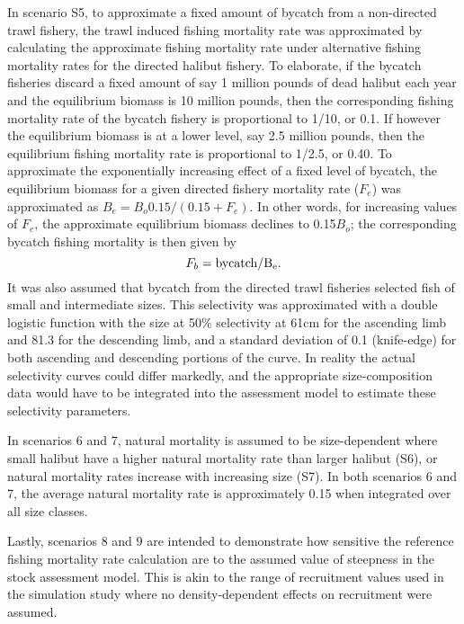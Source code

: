 In scenario S5, to approximate a fixed amount of bycatch from a non-directed trawl fishery, the trawl induced fishing mortality rate was approximated by calculating the approximate fishing mortality rate under alternative  fishing mortality rates for the directed halibut fishery.  To elaborate, if the bycatch fisheries discard a fixed amount of say 1 million pounds of dead halibut each year and the equilibrium biomass is 10 million pounds, then the corresponding fishing mortality rate of the bycatch fishery is proportional to 1/10, or 0.1.  If however the equilibrium biomass is at a lower level, say 2.5 million pounds, then the equilibrium fishing mortality rate is proportional to 1/2.5, or 0.40.  To approximate the exponentially increasing effect of a fixed level of bycatch, the equilibrium biomass for a given directed fishery mortality rate ($F_e$) was approximated as $B_e = B_o 0.15/(0.15+F_e)$.  In other words, for increasing values of $F_e$, the approximate equilibrium biomass declines to 0.15$B_o$; the corresponding bycatch fishing mortality is then given by \[F_b = \rm{bycatch}/B_e.\]  It was also assumed that bycatch from the directed trawl fisheries selected fish of small and intermediate sizes.  This selectivity was approximated with a double logistic function with the size at 50\% selectivity at 61cm for the ascending limb and 81.3 for the descending limb, and a standard deviation of 0.1 (knife-edge) for both ascending and descending portions of the curve.  In reality the actual selectivity curves could differ markedly, and the appropriate size-composition data would have to be integrated into the assessment model to estimate these selectivity parameters.

In scenarios 6 and 7, natural mortality is assumed to be size-dependent where small halibut have a higher natural mortality rate than larger halibut (S6), or natural mortality rates increase with increasing size (S7).  In both scenarios 6 and 7, the average natural mortality rate is approximately 0.15 when integrated over all size classes.

Lastly, scenarios 8 and 9 are intended to demonstrate how sensitive the reference fishing mortality rate calculation are to the assumed value of steepness in the stock assessment model.  This is akin to the range of recruitment values used in the \cite{clark2006assessment} simulation study where no density-dependent effects on recruitment were assumed.


